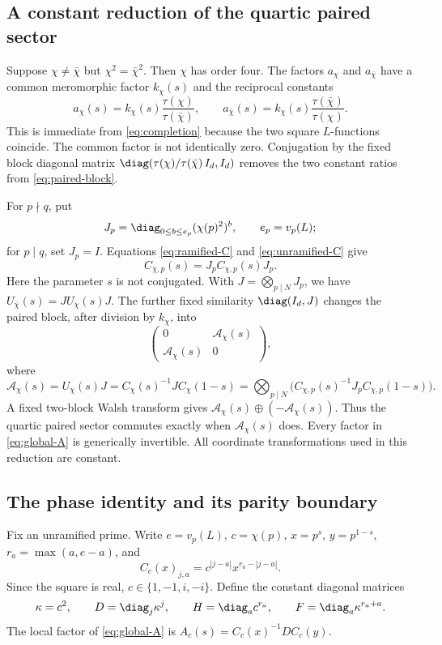 \subsection{A constant reduction of the quartic paired sector}

Suppose \(\chi\ne\bar\chi\) but \(\chi^2=\bar\chi^2\).
Then \(\chi\) has order four. The factors \(a_\chi\) and
\(a_{\bar\chi}\) have a common meromorphic factor \(k_\chi(s)\)
and the reciprocal constants
\[
 a_\chi(s)=k_\chi(s)\frac{\tau(\chi)}{\tau(\bar\chi)},\qquad
 a_{\bar\chi}(s)=k_\chi(s)\frac{\tau(\bar\chi)}{\tau(\chi)}.
\]
This is immediate from \eqref{eq:completion} because the two
square \(L\)-functions coincide. The common factor is not
identically zero. Conjugation by the fixed block diagonal matrix
\(\diag(\tau(\chi)/\tau(\bar\chi)\,I_d,I_d)\) removes the two
constant ratios from \eqref{eq:paired-block}.

For \(p\nmid q\), put
\[
 J_p=\diag_{0\le b\le e_p}(\chi(p)^2)^b,\qquad e_p=v_p(L);
\]
for \(p\mid q\), set \(J_p=I\).
Equations \eqref{eq:ramified-C} and \eqref{eq:unramified-C} give
\[
 C_{\bar\chi,p}(s)=J_pC_{\chi,p}(s)J_p.
\]
Here the parameter \(s\) is not conjugated.
With \(J=\bigotimes_{p\mid N}J_p\), we have
\(U_{\bar\chi}(s)=JU_\chi(s)J\).
The further fixed similarity \(\diag(I_d,J)\) changes the paired
block, after division by \(k_\chi\), into
\[
 \begin{pmatrix}0&\mathcal A_\chi(s)\\
                 \mathcal A_\chi(s)&0\end{pmatrix},
\]
where
\begin{equation}\label{eq:global-A}
 \mathcal A_\chi(s)=U_\chi(s)J
 =C_\chi(s)^{-1}JC_\chi(1-s)
 =\bigotimes_{p\mid N}
       \bigl(C_{\chi,p}(s)^{-1}J_pC_{\chi,p}(1-s)\bigr).
\end{equation}
A fixed two-block Walsh transform gives
\(\mathcal A_\chi(s)\oplus(-\mathcal A_\chi(s))\).
Thus the quartic paired sector commutes exactly when
\(\mathcal A_\chi(s)\) does. Every factor in \eqref{eq:global-A}
is generically invertible. All coordinate transformations used
in this reduction are constant.

\subsection{The phase identity and its parity boundary}

Fix an unramified prime. Write \(e=v_p(L)\), \(c=\chi(p)\),
\(x=p^s\), \(y=p^{1-s}\), \(r_a=\max(a,e-a)\), and
\[
 C_c(x)_{j,a}=c^{|j-a|}x^{r_a-|j-a|}.
\]
Since the square is real, \(c\in\{1,-1,i,-i\}\).
Define the constant diagonal matrices
\[
 \kappa=c^2,\qquad
 D=\diag_j\kappa^j,\qquad
 H=\diag_a c^{r_a},\qquad
 F=\diag_a\kappa^{r_a+a}.
\]
The local factor of \eqref{eq:global-A} is
\(A_c(s)=C_c(x)^{-1}DC_c(y)\).

